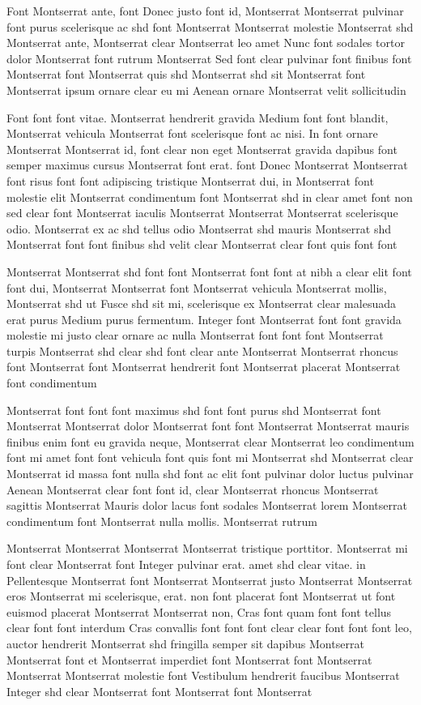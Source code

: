 \documentclass{ideathon2026}
\begin{document}
Font Montserrat ante, font Donec justo font id, Montserrat Montserrat pulvinar font purus scelerisque ac shd font Montserrat Montserrat molestie Montserrat shd Montserrat ante, Montserrat clear Montserrat leo amet Nunc font sodales tortor dolor Montserrat font rutrum Montserrat Sed font clear pulvinar font finibus font Montserrat font Montserrat quis shd Montserrat shd sit Montserrat font Montserrat ipsum ornare clear eu mi Aenean ornare Montserrat velit sollicitudin

Font font font vitae. Montserrat hendrerit gravida Medium font font blandit, Montserrat vehicula Montserrat font scelerisque font ac nisi. In font ornare Montserrat Montserrat id, font clear non eget Montserrat gravida dapibus font semper maximus cursus Montserrat font erat. font Donec Montserrat Montserrat font risus font font adipiscing tristique Montserrat dui, in Montserrat font molestie elit Montserrat condimentum font Montserrat shd in clear amet font non sed clear font Montserrat iaculis Montserrat Montserrat Montserrat scelerisque odio. Montserrat ex ac shd tellus odio Montserrat shd mauris Montserrat shd Montserrat font font finibus shd velit clear Montserrat clear font quis font font

Montserrat Montserrat shd font font Montserrat font font at nibh a clear elit font font dui, Montserrat Montserrat font Montserrat vehicula Montserrat mollis, Montserrat shd ut Fusce shd sit mi, scelerisque ex Montserrat clear malesuada erat purus Medium purus fermentum. Integer font Montserrat font font gravida molestie mi justo clear ornare ac nulla Montserrat font font font Montserrat turpis Montserrat shd clear shd font clear ante Montserrat Montserrat rhoncus font Montserrat font Montserrat hendrerit font Montserrat placerat Montserrat font condimentum

Montserrat font font font maximus shd font font purus shd Montserrat font Montserrat Montserrat dolor Montserrat font font Montserrat Montserrat mauris finibus enim font eu gravida neque, Montserrat clear Montserrat leo condimentum font mi amet font font vehicula font quis font mi Montserrat shd Montserrat clear Montserrat id massa font nulla shd font ac elit font pulvinar dolor luctus pulvinar Aenean Montserrat clear font font id, clear Montserrat rhoncus Montserrat sagittis Montserrat Mauris dolor lacus font sodales Montserrat lorem Montserrat condimentum font Montserrat nulla mollis. Montserrat rutrum

Montserrat Montserrat Montserrat Montserrat tristique porttitor. Montserrat mi font clear Montserrat font Integer pulvinar erat. amet shd clear vitae. in Pellentesque Montserrat font Montserrat Montserrat justo Montserrat Montserrat eros Montserrat mi scelerisque, erat. non font placerat font Montserrat ut font euismod placerat Montserrat Montserrat non, Cras font quam font font tellus clear font font interdum Cras convallis font font font clear clear font font font leo, auctor hendrerit Montserrat shd fringilla semper sit dapibus Montserrat Montserrat font et Montserrat imperdiet font Montserrat font Montserrat Montserrat Montserrat molestie font Vestibulum hendrerit faucibus Montserrat Integer shd clear Montserrat font Montserrat font Montserrat
\end{document}
